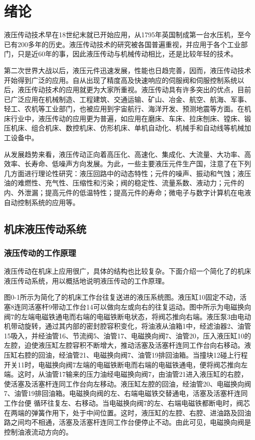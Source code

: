 
\chapter{绪论}

    液压传动技术早在18世纪末就已开始应用，从1795年英国制成第一台水压机，至今已有200多年的历史。液压传动技术的研究被各国普遍重视，并应用于各个工业部门，只是近60年的事，因此液压传动与机械传动相比，还是比较年轻的技术。

    第二次世界大战以后，液压元件迅速发展，性能也日趋完善，因而，液压传动技术开始得到广泛的应用。自从出现了精度高及快速响应的伺服阀和伺服控制系统以后，液压传动技术的应用就更为大家所重视。液压传动具有许多突出的优点，目前已广泛应用在机械制造、工程建筑、交通运输、矿山、冶金、航空、航海、军事、轻工、农机等工业部门，也被应用到宇宙航行、海洋开发、预测地震等方面。在机床行业中，液压传动的应用更为普遍，如应用在磨床、车床、拉床刨床、镗床、锻压机床、组合机床、数控机床、仿形机床、单机自动化、机械手和自动线等机械加工设备中。

    从发展趋势来看，液压传动正向着高压化、高速化、集成化、大流量、大功率、高效率、长寿命、低噪声方向发展。为此，一些主要液压元件生产国，注意了在下列几方面进行理论性研究：液压回路中的动态特性；元件的噪声、振动和气蚀；液压油的难燃性、充气性、压缩性和污染；阀的稳定性、流量系数、液动力；元件的内、外泄漏；提高元件的低温特性；提高元件的寿命；微电子与数字计算机在电液自动控制系统的应用等。

\section{机床液压传动系统}
\subsection{液压传动的工作原理}

    液压传动在机床上应用很广，具体的结构也比较复杂。下面介绍一个简化了的机床液压传动系统，用以概括地说明液压传动的工作原理。

    图0-1所示为简化了的机床工作台往复送进的液压系统图。液压缸10固定不动，活塞8连同活塞杆9带动工作台14可以做向左或向右的往复运动。图中所示为电磁换向阀7的左端电磁铁通电而右端的电磁铁断电状态，将阀芯推向右端。液压泵3由电动机带动旋转，通过其内部的密封腔容积变化，将油液从油箱1中，经滤油器2、油管15吸入，并经油管16、节流阀5、油管17、电磁换向阀7、油管20，压入液压缸10的左腔，迫使液压缸左腔容积不断增大，推动活塞及活塞杆连同工作台向右移动。液压缸右腔的回油，经油管21、电磁换向阀7、油管19排回油箱。当撞块12碰上行程开关11时，电磁换向阀7左端的电磁铁断电而右端的电磁铁通电，便将阀芯推向左端。这时，从油管17输来的压力油经电磁换向阀7，由油管21进入液压缸的右腔，使活塞及活塞杆连同工作台向左移动。液压缸左腔的回油，经油管20、电磁换向阀7、油管19排回油箱。电磁换向阀的左、右端电磁铁交替通电，活塞及活塞杆连同工作台便
循环往复左、右移动。当电磁换向阀7的左、右端电磁铁都断电时，阀芯在两端的弹簧作用下，处于中间位置。这时，液压缸的左腔、右腔、进油路及回油路之间均不相通，活塞及活塞杆连同工作台便停止不动。由此可见，电磁换向阀是控制油液流动方向的。


